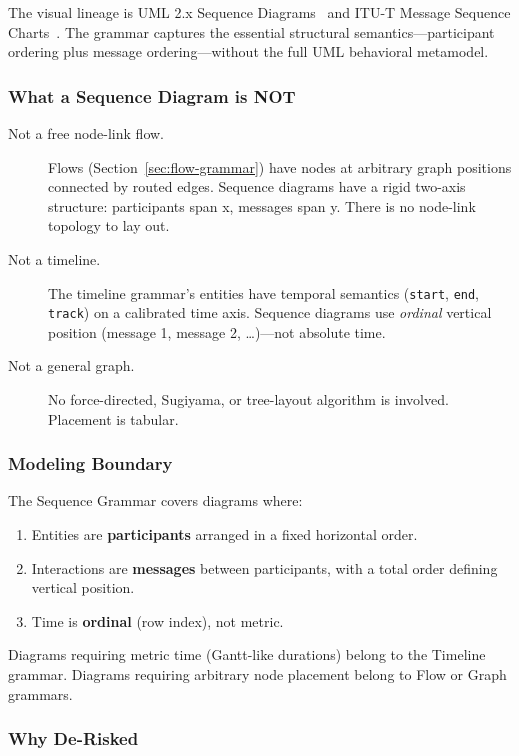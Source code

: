 The visual lineage is UML 2.x Sequence Diagrams~\cite{uml25} and ITU-T Message Sequence Charts~\cite{itu-msc}. The grammar captures the essential structural semantics---participant ordering plus message ordering---without the full UML behavioral metamodel.

\subsubsection{What a Sequence Diagram is NOT}

\begin{description}
  \item[Not a free node-link flow.] Flows (Section~\ref{sec:flow-grammar}) have nodes at arbitrary graph positions connected by routed edges. Sequence diagrams have a rigid two-axis structure: participants span x, messages span y. There is no node-link topology to lay out.
  \item[Not a timeline.] The timeline grammar's entities have temporal semantics (\texttt{start}, \texttt{end}, \texttt{track}) on a calibrated time axis. Sequence diagrams use \emph{ordinal} vertical position (message 1, message 2, \ldots)---not absolute time.
  \item[Not a general graph.] No force-directed, Sugiyama, or tree-layout algorithm is involved. Placement is tabular.
\end{description}

\subsubsection{Modeling Boundary}

The Sequence Grammar covers diagrams where:
\begin{enumerate}
  \item Entities are \textbf{participants} arranged in a fixed horizontal order.
  \item Interactions are \textbf{messages} between participants, with a total order defining vertical position.
  \item Time is \textbf{ordinal} (row index), not metric.
\end{enumerate}

Diagrams requiring metric time (Gantt-like durations) belong to the Timeline grammar. Diagrams requiring arbitrary node placement belong to Flow or Graph grammars.

\subsubsection{Why De-Risked}

